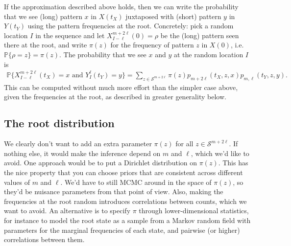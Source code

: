 \documentclass{article}
\renewcommand{\P}{\mathbb{P}}
\newcommand{\calS}{\mathcal{S}}  %
\theoremstyle{plain}
\theoremstyle{definition}
\begin{document}
If the approximation described above holds,
then we can write the probability that we see (long) pattern $x$ in $X(t_X)$ juxtaposed with (short) pattern $y$ in $Y(t_Y)$
using the pattern frequencies at the root.
Concretely: pick a random location $I$ in the sequence and let $X_{I-\ell}^{m+2\ell}(0) = \rho$ be the (long) pattern seen there at the root,
and write $\pi(z)$ for the frequency of pattern $z$ in $X(0)$, i.e.\ $\P\{\rho=z\}=\pi(z)$.
The probability that we see $x$ and $y$ at the random location $I$ is
\begin{align} \label{eqn:phylo_likelihood}
    \P\{X_{I-\ell}^{m+2\ell}(t_X)=x \text{ and } Y_I^\ell(t_Y)=y \} = \sum_{z \in \calS^{m+2\ell}} \pi(z) p_{m+2\ell}(t_X,z,x) p_{m,\ell}(t_Y,z,y) .
\end{align}
This can be computed without much more effort than the simpler case above,
given the frequencies at the root, as described in greater generality below.



\subsection{The root distribution}

We clearly don't want to add an extra parameter $\pi(z)$ for all $z \in \calS^{m+2\ell}$.
If nothing else, it would make the inference depend on $m$ and $\ell$, which we'd like to avoid.
One approach would be to put a Dirichlet distribution on $\pi(z)$.
This has the nice property that you can choose priors that are consistent across different values of $m$ and $\ell$.
We'd have to still MCMC around in the space of $\pi(z)$, so they'd be nuisance parameters from that point of view.
Also, making the frequencies at the root random introduces correlations between counts, which we want to avoid.
An alternative is to specify $\pi$ through lower-dimensional statistics,
for instance to model the root state as a sample from a Markov random field
with parameters for the marginal frequencies of each state, and pairwise (or higher) correlations between them.
\end{document}
